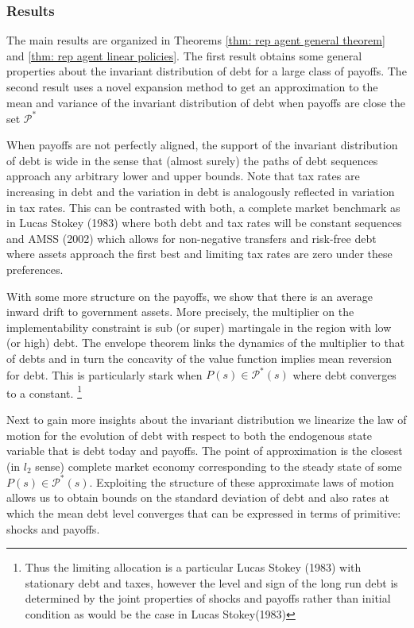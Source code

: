 \documentclass[11.5pt,twoside]{article}
\begin{document}
\subsubsection{Results}

The main results are organized in Theorems \ref{thm: rep agent general theorem} and \ref{thm: rep agent linear policies}. The first result obtains some general properties about the invariant distribution of debt for a large class of payoffs.  The second result uses a novel expansion method to get an approximation to the mean and variance of the invariant distribution of debt when payoffs are close the set $\mathcal{P}^*$

When payoffs are not perfectly aligned, the support of the invariant distribution of debt is wide in the sense that (almost surely) the paths of debt sequences approach any arbitrary lower and upper bounds. Note that tax rates are increasing in debt and the variation in debt is analogously reflected in variation in tax rates. This can be contrasted with both, a complete market benchmark as in Lucas Stokey (1983) where both debt and tax rates will be constant  sequences and AMSS (2002) which allows for non-negative transfers and risk-free debt where assets approach the first best and limiting tax rates are zero under these preferences.

With some more structure on the payoffs, we show that there is an average inward drift to government assets. More precisely, the multiplier on the implementability constraint is sub (or super) martingale in the region with low (or high) debt. The envelope theorem links the dynamics of the multiplier to that of debts and in turn the concavity of the value function implies mean reversion for debt. This is particularly stark when $P(s)\in \mathcal{P}^*(s)$ where debt converges to a constant. \footnote{Thus the limiting allocation is a particular Lucas Stokey (1983) with stationary debt and taxes, however the level and sign of the long run debt is determined by the joint properties of shocks and payoffs rather than initial condition as would be the case in Lucas Stokey(1983) }


Next to gain more insights about the invariant distribution we linearize the law of motion for the evolution of debt with respect to both the endogenous state variable that is debt today and payoffs. The point of approximation is the closest (in $l_2$ sense) complete market economy corresponding to the steady state of  some $P(s)\in\mathcal{P}^*(s)$. Exploiting the structure of these approximate laws of motion allows us to obtain bounds on the standard deviation of debt and also rates at which the mean debt level converges that can be expressed in terms of primitive: shocks and payoffs.
\end{document}
